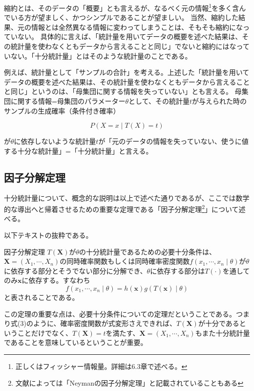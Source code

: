 \documentclass[a4paper,dvipdfmx]{jsarticle}
\begin{document}
縮約とは、そのデータの「概要」とも言えるが、なるべく元の情報\footnote{正しくはフィッシャー情報量。詳細は6.3章で述べる。}を多く含んでいる方が望ましく、かつシンプルであることが望ましい。
当然、縮約した結果、元の情報とは全然異なる情報に変わってしまうことは、そもそも縮約になっていない。
具体的に言えば、「統計量を用いてデータの概要を述べた結果は、その統計量を使わなくともデータから言えることと同じ」でないと縮約にはなっていない。「十分統計量」とはそのような統計量のことである。

例えば、統計量として「サンプルの合計」を考える。上述した「統計量を用いてデータの概要を述べた結果は、その統計量を使わなくともデータから言えることと同じ」というのは、「母集団に関する情報を失っていない」とも言える。
母集団に関する情報=母集団のパラメーター$\theta$として、その統計量$t$が与えられた時のサンプルの生成確率（条件付き確率）

\begin{equation}
P(X = x \mid T(X) = t)
\end{equation}

が$\theta$に依存しないような統計量$t$が「元のデータの情報を失っていない、使うに値する十分な統計量」=「十分統計量」と言える。

\subsection{因子分解定理}
十分統計量について、概念的な説明は以上で述べた通りであるが、ここでは数学的な導出へと帰着させるための重要な定理である「因子分解定理\footnote{文献によっては「Neymanの因子分解定理」と記載されていることもある}」について述べる。

\vspace{\baselineskip}
以下テキストの抜粋である。

\begin{itembox}[c]{因子分解定理}
$T(\bm{X})$が$\theta$の十分統計量であるための必要十分条件は、$\bm{X} = (X_1,\cdots , X_n)$の同時確率関数もしくは同時確率密度関数$f(x_1, \cdots, x_n \mid \theta)$が$\theta$に依存する部分とそうでない部分に分解でき、$\theta$に依存する部分は$T(\cdot)$を通してのみ$\bm{x}$に依存する。すなわち
\begin{equation}
f(x_1, \cdots, x_n \mid \theta) = h(\bm{x})g(T(\bm{x}) \mid \theta)
\end{equation}
と表されることである。
\end{itembox}

この定理の重要な点は、必要十分条件についての定理だということである。つまり式(3)のように、確率密度関数が式変形さえできれば、$T(\bm{X})$が十分であるということだけでなく、$T(\bm{X})=t$を満たす、$\bm{X} = (X_1,\cdots , X_n)$もまた十分統計量であることを意味しているということが重要。
\end{document}
